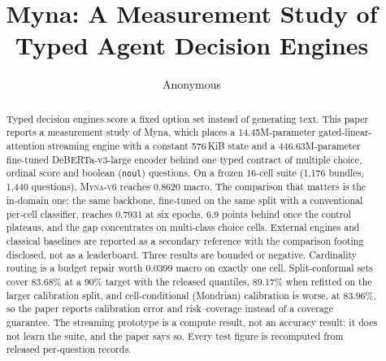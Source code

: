 \documentclass[11pt]{article}
\title{Myna: A Measurement Study of Typed Agent Decision Engines}
\author{Anonymous}
\newcommand{\vsix}{\textsc{Myna-v6}}
\begin{document}
\maketitle
\begin{abstract}
Typed decision engines score a fixed option set instead of generating text. This paper reports a
measurement study of Myna, which places a 14.45M-parameter gated-linear-attention streaming engine
with a constant 576\,KiB state and a 446.63M-parameter fine-tuned DeBERTa-v3-large encoder behind one
typed contract of multiple choice, ordinal score and boolean (\texttt{noul}) questions. On a frozen
16-cell suite (1,176 bundles, 1,440 questions), \vsix{} reaches 0.8620 macro. The comparison that
matters is the in-domain one: the same backbone, fine-tuned on the same split with a conventional
per-cell classifier, reaches 0.7931 at six epochs, 6.9 points behind once the control plateaus, and the gap concentrates on
multi-class choice cells. External engines and classical baselines are reported as a
secondary reference with the comparison footing disclosed, not as a leaderboard. Three results are bounded or negative.
Cardinality routing is a budget repair worth 0.0399 macro on exactly one cell. Split-conformal sets
cover 83.68\% at a 90\% target with the released quantiles, 89.17\% when refitted on the larger
calibration split, and cell-conditional (Mondrian) calibration is worse, at 83.96\%, so the paper
reports calibration error and risk--coverage instead of a coverage guarantee. The streaming
prototype is a compute result, not an accuracy result: it does not learn the suite, and the paper
says so. Every test figure is recomputed from released per-question records.
\end{abstract}






\appendix

\end{document}

